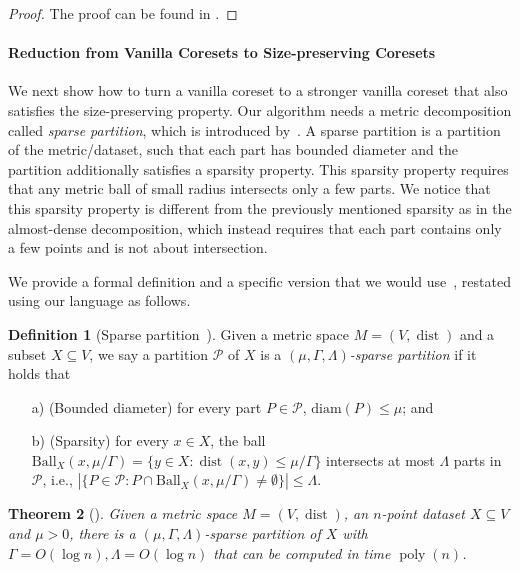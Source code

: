 \documentclass[letterpaper,11pt]{article}
\theoremstyle{plain}
\newtheorem{theorem}{Theorem}[section]
\theoremstyle{definition}
\newtheorem{definition}[theorem]{Definition}
\theoremstyle{remark}
\DeclareMathOperator{\poly}{poly}
\DeclareMathOperator{\dist}{dist}
\newcommand{\diam}{\mathrm{diam}}
\newcommand{\calP}{\mathcal{P}}
\newcommand{\ball}{\mathrm{Ball}}
\begin{document}
\begin{proof}
    The proof can be found in .
\end{proof}
\paragraph{Reduction from Vanilla Coresets to Size-preserving Coresets}
We next show how to turn a vanilla coreset to a stronger vanilla coreset that also satisfies the size-preserving property.
Our algorithm needs a metric decomposition called \emph{sparse partition}, which is introduced by~\cite{Jia05Universal}.
A sparse partition is a partition of the metric/dataset,
such that each part has bounded diameter and the partition additionally satisfies a sparsity property.
This sparsity property requires that any metric ball of small radius intersects only a few parts.
We notice that this sparsity property is different from the previously mentioned sparsity as in the almost-dense decomposition, which instead requires that each part contains only a few points and is not about intersection.

We provide a formal definition and a specific version that we would use~\cite{Jia05Universal}, restated using our language as follows.



\begin{definition}[Sparse partition~\cite{Jia05Universal}]
    \label{def:sparse partition}
    Given a metric space $M=(V,\dist)$ and a subset $X\subseteq V$, we say a partition $\calP$ of $X$ is a \emph{$(\mu,\Gamma,\Lambda)$-sparse partition} if it holds that 
    \begin{itemize}
        \item[a)] (Bounded diameter) for every part $P\in \calP$, $\diam(P)\le \mu$; and
        \item[b)] (Sparsity) for every $x\in X$, the ball $\ball_X(x,\mu/\Gamma)=\{y\in X:\dist(x,y)\le \mu/\Gamma\}$ intersects at most $\Lambda$ parts in $\calP$, i.e., $|\{P\in\calP: P\cap \ball_X(x,\mu/\Gamma)\neq\emptyset\}|\le \Lambda$.
    \end{itemize}
\end{definition}


\begin{theorem}[\cite{Jia05Universal}]
    \label{thm:sparse partition}
    Given a metric space $M=(V,\dist)$, an $n$-point dataset $X\subseteq V$ and $\mu > 0$, there is a $(\mu,\Gamma,\Lambda)$-sparse partition of $X$ with $\Gamma = O(\log n), \Lambda = O(\log n)$ that can be computed in time $\poly(n)$.
\end{theorem}
\end{document}
